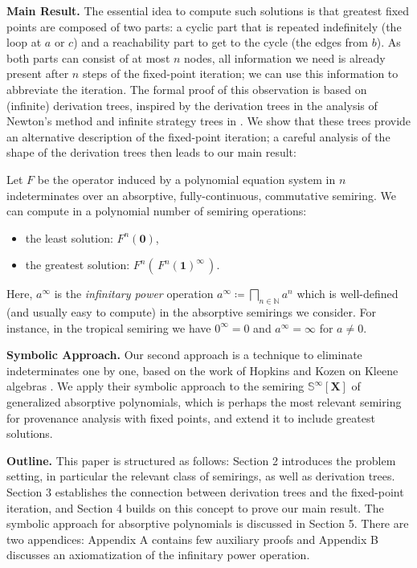 \documentclass[english,runningheads,a4paper,envcountsame]{llncs}
\newcommand{\IntroParagraph}[1]{\bigskip\noindent\textbf{#1.}}
\newcommand{\Inf}{\bigsqcap}
\newcommand{\Sinf}{{\mathbb S}^{\infty}}
\newcommand{\NN}{\mathbb{N}}
\newcommand*{\XX}{{\bm X}}
\newcommand{\zero}{\tup 0}
\newcommand{\one}{\tup 1}
\newcommand*{\tup}[1]{\mathbf{#1}}
\begin{document}
\IntroParagraph{Main Result}
The essential idea to compute such solutions is that greatest fixed points are composed of two parts: a cyclic part that is repeated indefinitely (the loop at $a$ or $c$) and a reachability part to get to the cycle (the edges from $b$).
As both parts can consist of at most $n$ nodes, all information we need is already present after $n$ steps of the fixed-point iteration; we can use this information to abbreviate the iteration.
The formal proof of this observation is based on (infinite) derivation trees, inspired by the derivation trees in the analysis of Newton's method \cite{Newton} and infinite strategy trees in \cite{DannertGraNaaTan21}.
We show that these trees provide an alternative description of the fixed-point iteration; a careful analysis of the shape of the derivation trees then leads to our main result:

\begin{theorem}
Let $F$ be the operator induced by a polynomial equation system in $n$ indeterminates over an absorptive, fully-continuous, commutative semiring.
We can compute in a polynomial number of semiring operations:
\begin{itemize}
\item the least solution: $F^n(\zero)$,
\item the greatest solution: $F^n( \, F^n(\one)^\infty \, )$.
\end{itemize}
\end{theorem}

Here, $a^\infty$ is the \emph{infinitary power} operation $a^\infty \coloneqq \Inf_{n \in \NN} a^n$ which is well-defined (and usually easy to compute) in the absorptive semirings we consider.
For instance, in the tropical semiring we have $0^\infty = 0$ and $a^\infty = \infty$ for $a \neq 0$.


\IntroParagraph{Symbolic Approach}
Our second approach is a technique to eliminate indeterminates one by one, based on the work of Hopkins and Kozen on Kleene algebras \cite{Kleene}.
We apply their symbolic approach to the semiring $\Sinf[\XX]$ of generalized absorptive polynomials, which is perhaps the most relevant semiring for provenance analysis with fixed points, and extend it to include greatest solutions.


\IntroParagraph{Outline}
This paper is structured as follows:
Section 2 introduces the problem setting, in particular the relevant class of semirings, as well as derivation trees.
Section 3 establishes the connection between derivation trees and the fixed-point iteration, and Section 4 builds on this concept to prove our main result.
The symbolic approach for absorptive polynomials is discussed in Section 5.
There are two appendices: Appendix A contains few auxiliary proofs and Appendix B discusses an axiomatization of the infinitary power operation.
\end{document}

